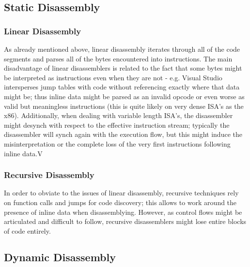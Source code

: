 \subsection{Static Disassembly}

\subsubsection{Linear Disassembly}
As already mentioned above, linear disassembly iterates through all of the code segments and parses all of the bytes
encountered into instructions. The main disadvantage of linear disassemblers is related to the fact that some bytes
might be interpreted as instructions even when they are not - e.g. Visual Studio intersperses jump tables with code
without referencing exactly where that data might be; thus inline data might be parsed as an invalid opcode or even
worse as valid but meaningless instructions (this is quite likely on very dense ISA's as the x86).
Additionally, when dealing with variable length ISA's, the disassembler might desynch with respect to the effective
instruction stream; typically the disassembler will synch again with the execution flow, but this might induce the
misinterpretation or the complete loss of the very first instructions following inline data.V

\subsubsection{Recursive Disassembly}
In order to obviate to the issues of linear disassembly, recursive techniques rely on function calls and jumps for code
discovery; this allows to work around the presence of inline data when disassemblying. However, as control flows might
be articulated and difficult to follow, recursive disassemblers might lose entire blocks of code entirely.


\subsection{Dynamic Disassembly}

